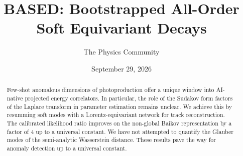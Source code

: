 \documentclass[11pt]{article}
\title{BASED: Bootstrapped All-Order Soft Equivariant Decays}
\author{The Physics Community}
\date{September 29, 2026}
\begin{document}
\maketitle
\begin{abstract}
Few-shot anomalous dimensions of photoproduction offer a unique window
into AI-native projected energy correlators. In particular, the role of
the Sudakov form factors of the Laplace transform in parameter
estimation remains unclear. We achieve this by resumming soft modes with
a Lorentz-equivariant network for track reconstruction. The calibrated
likelihood ratio improves on the non-global Baikov representation by a
factor of 4 up to a universal constant. We have not attempted to
quantify the Glauber modes of the semi-analytic Wasserstein distance.
These results pave the way for anomaly detection up to a universal
constant.
\end{abstract}
\tableofcontents





\nocite{*}


\end{document}
